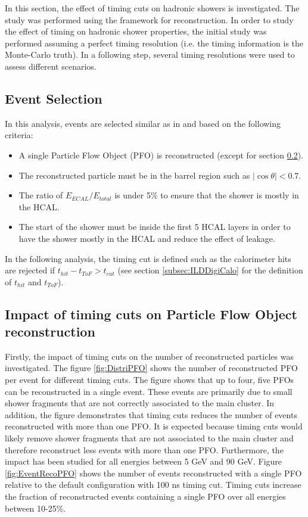 In this section, the effect of timing cuts on hadronic showers is investigated. The study was performed using the \ilcsoft framework for reconstruction. In order to study the effect of timing on hadronic shower properties, the initial study was performed assuming a perfect timing resolution (i.e. the timing information is the Monte-Carlo truth). In a following step, several timing resolutions were used to assess different scenarios.

\subsection{Event Selection}

In this analysis, events are selected similar as in \cite{SoftCompNew2012} and based on the following criteria:
\begin{itemize}
  \item A single Particle Flow Object (PFO) is reconstructed (except for section \ref{sec:ImpactNPFO}).
  \item The reconstructed particle must be in the barrel region such as $|\cos\theta| < 0.7$.
  \item The ratio of $E_{ECAL}/E_{total}$ is under 5\% to ensure that the shower is mostly in the HCAL.
  \item The start of the shower must be inside the first 5 HCAL layers in order to have the shower mostly in the HCAL and reduce the effect of leakage.
\end{itemize}

In the following analysis, the timing cut is defined such as the calorimeter hits are rejected if $t_{hit} - t_{ToF} > t_{cut}$ (see section \ref{subsec:ILDDigiCalo} for the definition of $t_{hit}$ and $t_{ToF}$).

\subsection{Impact of timing cuts on Particle Flow Object reconstruction}
\label{sec:ImpactNPFO}

Firstly, the impact of timing cuts on the number of reconstructed particles was investigated. The figure \ref{fig:DistriPFO} shows the number of reconstructed PFO per event for different timing cuts. The figure shows that up to four, five PFOs can be reconstructed in a single event. These events are primarily due to small shower fragments that are not correctly associated to the main cluster. In addition, the figure demonstrates that timing cuts reduces the number of events reconstructed with more than one PFO. It is expected because timing cuts would likely remove shower fragments that are not associated to the main cluster and therefore reconstruct less events with more than one PFO. Furthermore, the impact has been studied for all energies between 5 GeV and 90 GeV. Figure \ref{fig:EventRecoPFO} shows the number of events reconstructed with a single PFO relative to the default configuration with 100 ns timing cut. Timing cuts increase the fraction of reconstructed events containing a single PFO over all energies between 10-25\%.

